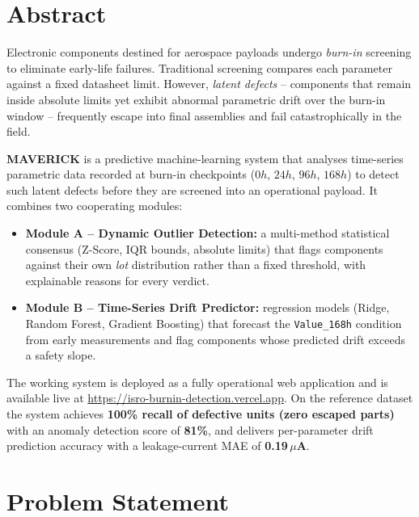 \documentclass[11pt,a4paper]{article}
\begin{document}
\section*{Abstract}

Electronic components destined for aerospace payloads undergo \emph{burn-in} screening to
eliminate early-life failures. Traditional screening compares each parameter against a fixed
datasheet limit. However, \emph{latent defects} -- components that remain inside absolute
limits yet exhibit abnormal parametric drift over the burn-in window -- frequently escape into
final assemblies and fail catastrophically in the field.

\textbf{MAVERICK} is a predictive machine-learning system that analyses time-series parametric
data recorded at burn-in checkpoints ($0h$, $24h$, $96h$, $168h$) to detect such latent defects
before they are screened into an operational payload. It combines two cooperating modules:

\begin{itemize}[leftmargin=1.5em]
  \item \textbf{Module A -- Dynamic Outlier Detection:} a multi-method statistical consensus
        (Z-Score, IQR bounds, absolute limits) that flags components against their own \emph{lot}
        distribution rather than a fixed threshold, with explainable reasons for every verdict.
  \item \textbf{Module B -- Time-Series Drift Predictor:} regression models (Ridge, Random
        Forest, Gradient Boosting) that forecast the \texttt{Value\_168h} condition from early
        measurements and flag components whose predicted drift exceeds a safety slope.
\end{itemize}

The working system is deployed as a fully operational web application and is available live at
\url{https://isro-burnin-detection.vercel.app}. On the reference dataset the system achieves
\textbf{100\% recall of defective units (zero escaped parts)} with an anomaly detection score of
\textbf{81\%}, and delivers per-parameter drift prediction accuracy with a leakage-current MAE of
\textbf{0.19\,$\mu$A}.

\section{Problem Statement}
\label{sec:problem}
\end{document}

